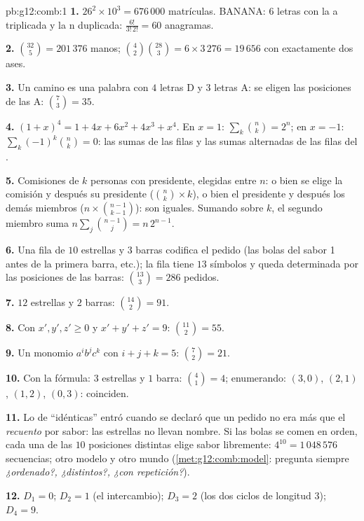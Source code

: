 \begin{solution}{pb:g12:comb:1}
\textbf{1.} $26^2 \times 10^3 = 676\,000$ matrículas. BANANA: $6$ letras
con la a triplicada y la n duplicada: $\frac{6!}{3!\,2!} = 60$ anagramas.

\textbf{2.} $\binom{32}{5} = 201\,376$ manos;
$\binom42 \binom{28}{3} = 6 \times 3\,276 = 19\,656$ con exactamente dos
ases.

\textbf{3.} Un camino es una palabra con $4$ letras D y $3$ letras A: se
eligen las posiciones de las A: $\binom73 = 35$.

\textbf{4.} $(1+x)^4 = 1 + 4x + 6x^2 + 4x^3 + x^4$. En $x = 1$:
$\sum_k \binom nk = 2^n$; en $x = -1$: $\sum_k (-1)^k \binom nk = 0$: las
sumas de las filas y las sumas alternadas de las filas del .

\textbf{5.} Comisiones de $k$ personas con presidente, elegidas entre $n$:
o bien se elige la comisión y después su presidente
($\binom nk \times k$), o bien el presidente y después los demás miembros
($n \times \binom{n-1}{k-1}$): son iguales. Sumando sobre $k$, el segundo
miembro suma $n \sum_j \binom{n-1}{j} = n\,2^{n-1}$.

\textbf{6.} Una fila de $10$ estrellas y $3$ barras codifica el pedido (las
bolas del sabor 1 antes de la primera barra, etc.); la fila tiene $13$
símbolos y queda determinada por las posiciones de las barras:
$\binom{13}{3} = 286$ pedidos.

\textbf{7.} $12$ estrellas y $2$ barras: $\binom{14}{2} = 91$.

\textbf{8.} Con $x', y', z' \geq 0$ y $x' + y' + z' = 9$:
$\binom{11}{2} = 55$.

\textbf{9.} Un monomio $a^i b^j c^k$ con $i + j + k = 5$:
$\binom72 = 21$.

\textbf{10.} Con la fórmula: $3$ estrellas y $1$ barra:
$\binom41 = 4$; enumerando: $(3,0)$, $(2,1)$, $(1,2)$, $(0,3)$: coinciden.

\textbf{11.} Lo de ``idénticas'' entró cuando se declaró que un pedido no
era más que el \emph{recuento} por sabor: las estrellas no llevan nombre.
Si las bolas se comen en orden, cada una de las $10$ posiciones distintas
elige sabor libremente: $4^{10} = 1\,048\,576$ secuencias; otro modelo y
otro mundo (\cref{met:g12:comb:model}: pregunta siempre
\emph{¿ordenado?, ¿distintos?, ¿con repetición?}).

\textbf{12.} $D_1 = 0$; $D_2 = 1$ (el intercambio); $D_3 = 2$ (los dos
ciclos de longitud $3$); $D_4 = 9$.


\end{solution}
